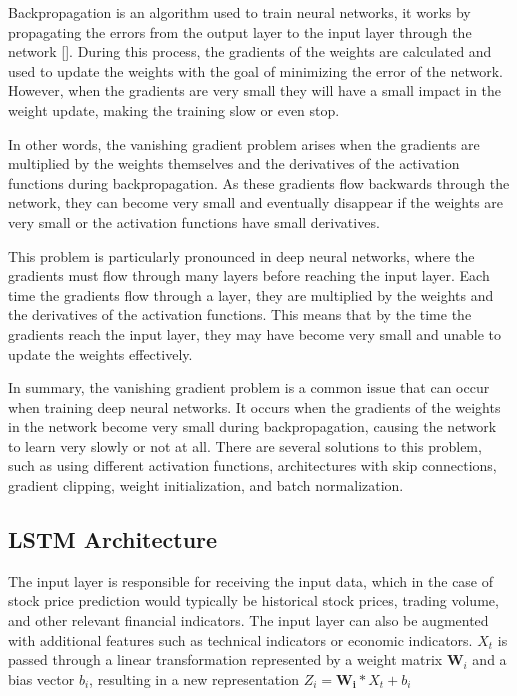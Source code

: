 \documentclass[a4paper]{article}
\begin{document}
Backpropagation is an algorithm used to train neural networks, it works by propagating the errors from the output layer to the input layer through the network [\cite{rumelhart1985learning}]. During this process, the gradients of the weights are calculated and used to update the weights with the goal of minimizing the error of the network. However, when the gradients are very small they will have a small impact in the weight update, making the training slow or even stop.

In other words, the vanishing gradient problem arises when the gradients are multiplied by the weights themselves and the derivatives of the activation functions during backpropagation. As these gradients flow backwards through the network, they can become very small and eventually disappear if the weights are very small or the activation functions have small derivatives.

This problem is particularly pronounced in deep neural networks, where the gradients must flow through many layers before reaching the input layer. Each time the gradients flow through a layer, they are multiplied by the weights and the derivatives of the activation functions. This means that by the time the gradients reach the input layer, they may have become very small and unable to update the weights effectively.

In summary, the vanishing gradient problem is a common issue that can occur when training deep neural networks. It occurs when the gradients of the weights in the network become very small during backpropagation, causing the network to learn very slowly or not at all. There are several solutions to this problem, such as using different activation functions, architectures with skip connections, gradient clipping, weight initialization, and batch normalization.
\subsection{LSTM Architecture} \label{lstm architecture}
The input layer is responsible for receiving the input data, which in the case of stock price prediction would typically be historical stock prices, trading volume, and other relevant financial indicators. The input layer can also be augmented with additional features such as technical indicators or economic indicators. $X_t$ is passed through a linear transformation represented by a weight matrix $\mathbf{W}_i$ and a bias vector $b_i$, resulting in a new representation $Z_i = \mathbf{W_i} * X_t + b_i$
\end{document}

